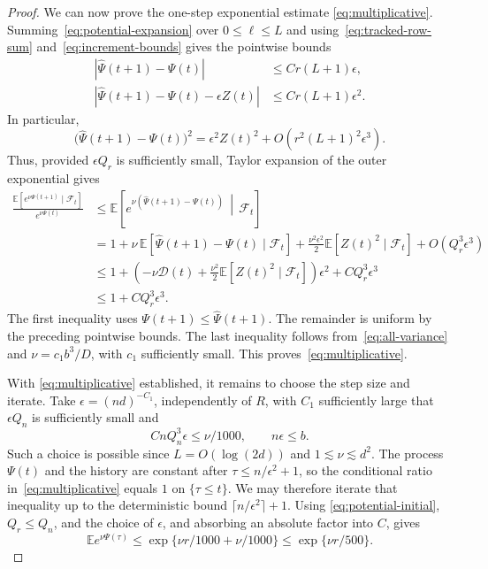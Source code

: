 \documentclass[reqno]{amsart}
\theoremstyle{definition}
\newcommand{\E}{\mathbb E}
\begin{document}
\begin{proof}
We can now prove the one-step exponential estimate \eqref{eq:multiplicative}. Summing~\eqref{eq:potential-expansion} over $0\le\ell\le L$ and using~\eqref{eq:tracked-row-sum} and~\eqref{eq:increment-bounds} gives the pointwise bounds
\[
\begin{aligned}
  |\widehat\Psi(t+1)-\Psi(t)| &\le Cr(L+1)\epsilon,\\
  |\widehat\Psi(t+1)-\Psi(t)-\epsilon Z(t)| &\le Cr(L+1)\epsilon^2.
\end{aligned}
\]
In particular,
\[ \bigl(\widehat\Psi(t+1)-\Psi(t)\bigr)^2 =\epsilon^2Z(t)^2 +O\!\left(r^2(L+1)^2\epsilon^3\right). \]
Thus, provided $\epsilon Q_r$ is sufficiently small, Taylor expansion of the outer exponential gives
\begin{align*}
  \frac{\E[e^{\nu\Psi(t+1)}\mid\mathcal F_t]} {e^{\nu\Psi(t)}} &\le \E\!\left[ e^{\nu(\widehat\Psi(t+1)-\Psi(t))} \,\middle|\,\mathcal F_t \right]\\
  &=1+\nu\,\E[\widehat\Psi(t+1)-\Psi(t)\mid\mathcal F_t] +\frac{\nu^2\epsilon^2}{2} \E[Z(t)^2\mid\mathcal F_t] +O(Q_r^3\epsilon^3)\\
  &\le1+\left( -\nu\mathcal D(t) +\frac{\nu^2}{2}\E[Z(t)^2\mid\mathcal F_t] \right)\epsilon^2 +CQ_r^3\epsilon^3\\
  &\le1+CQ_r^3\epsilon^3.
\end{align*}
The first inequality uses $\Psi(t+1)\le\widehat\Psi(t+1)$. The remainder is uniform by the preceding pointwise bounds. The last inequality follows from~\eqref{eq:all-variance} and $\nu=c_1b^3/D$, with $c_1$ sufficiently small. This proves~\eqref{eq:multiplicative}.

With \eqref{eq:multiplicative} established, it remains to choose the step size and iterate. Take $\epsilon=(nd)^{-C_1}$, independently of $R$, with $C_1$ sufficiently large that $\epsilon Q_n$ is sufficiently small and
\[ CnQ_n^3\epsilon\le\nu/1000, \qquad n\epsilon\le b. \]
Such a choice is possible since $L=O(\log(2d))$ and $1\lesssim\nu\lesssim d^2$. The process $\Psi(t)$ and the history are constant after $\tau\le n/\epsilon^2+1$, so the conditional ratio in~\eqref{eq:multiplicative} equals $1$ on $\{\tau\le t\}$. We may therefore iterate that inequality up to the deterministic bound $\lceil n/\epsilon^2\rceil+1$. Using \eqref{eq:potential-initial}, $Q_r\le Q_n$, and the choice of $\epsilon$, and absorbing an absolute factor into $C$, gives
\[ \E e^{\nu\Psi(\tau)} \le\exp\{\nu r/1000+\nu/1000\} \le\exp\{\nu r/500\}. \]
\end{proof}
\end{document}
